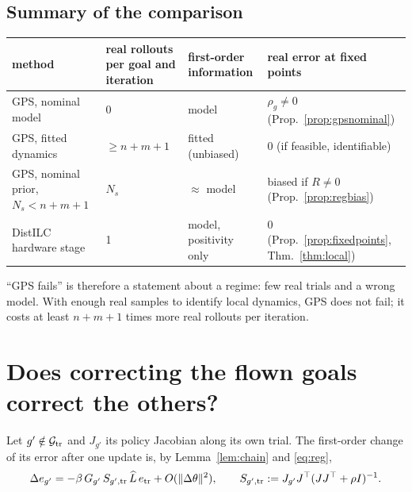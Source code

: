 \documentclass[11pt]{article}
\theoremstyle{definition}
\theoremstyle{remark}
\newcommand{\cG}{\mathcal{G}}
\newcommand{\n}[1]{\lVert #1\rVert}
\newcommand{\Lhat}{\widehat L}
\begin{document}
\subsection{Summary of the comparison}
\begin{center}
\begin{tabular}{@{}p{}p{}p{}p{}@{}}
\toprule
method & real rollouts per goal and iteration & first-order information & real error at fixed points\\
\midrule
GPS, nominal model & 0 & model & $\rho_g\neq0$ (Prop.~\ref{prop:gpsnominal})\\
GPS, fitted dynamics & $\ge n+m+1$ & fitted (unbiased) & $0$ (if feasible, identifiable)\\
GPS, nominal prior, $N_s<n+m+1$ & $N_s$ & $\approx$ model & biased if $R\ne0$ (Prop.~\ref{prop:regbias})\\
DistILC hardware stage & 1 & model, positivity only & $0$ (Prop.~\ref{prop:fixedpoints}, Thm.~\ref{thm:local})\\
\bottomrule
\end{tabular}
\end{center}
``GPS fails'' is therefore a statement about a regime: few real trials and a wrong model. With enough real samples to
identify local dynamics, GPS does not fail; it costs at least $n+m+1$ times more real rollouts per iteration.

\section{Does correcting the flown goals correct the others?}\label{sec:transfer}

Let $g'\notin\cG_{\rm tr}$ and $J_{g'}$ its policy Jacobian along its own trial. The first-order change of its error
after one update is, by Lemma~\ref{lem:chain} and \eqref{eq:reg},
\begin{equation}\label{eq:transfer}
\Delta e_{g'}=-\beta\,G_{g'}\,S_{g',{\rm tr}}\,\Lhat\,e_{\rm tr}+O(\n{\Delta\theta}^2),\qquad
S_{g',{\rm tr}}:=J_{g'}J^\top(JJ^\top+\rho I)^{-1}.
\end{equation}
\end{document}
